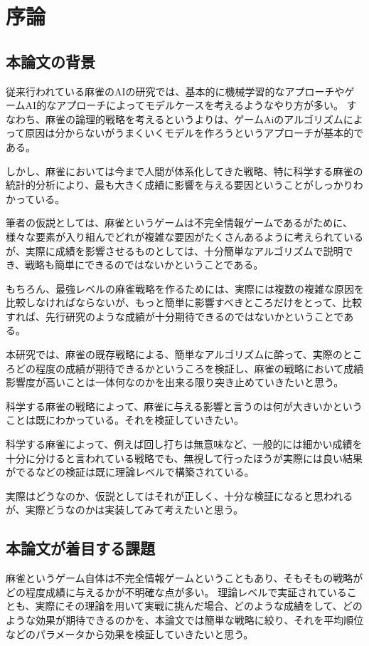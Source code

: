 \chapter{序論}
\label{chap:introduction}

\section{本論文の背景}
従来行われている麻雀のAIの研究では、基本的に機械学習的なアプローチやゲームAI的なアプローチによってモデルケースを考えるようなやり方が多い。
すなわち、麻雀の論理的戦略を考えるというよりは、ゲームAiのアルゴリズムによって原因は分からないがうまくいくモデルを作ろうというアプローチが基本的である。

しかし、麻雀においては今まで人間が体系化してきた戦略、特に科学する麻雀の統計的分析により、最も大きく成績に影響を与える要因ということがしっかりわかっている。

筆者の仮説としては、麻雀というゲームは不完全情報ゲームであるがために、様々な要素が入り組んでどれが複雑な要因がたくさんあるように考えられているが、実際に成績を影響させるものとしては、十分簡単なアルゴリズムで説明でき、戦略も簡単にできるのではないかということである。

もちろん、最強レベルの麻雀戦略を作るためには、実際には複数の複雑な原因を比較しなければならないが、もっと簡単に影響すべきところだけをとって、比較すれば、先行研究のような成績が十分期待できるのではないかということである。

本研究では、麻雀の既存戦略による、簡単なアルゴリズムに酔って、実際のところどの程度の成績が期待できるかというころを検証し、麻雀の戦略において成績影響度が高いことは一体何なのかを出来る限り突き止めていきたいと思う。

科学する麻雀の戦略によって、麻雀に与える影響と言うのは何が大きいかということは既にわかっている。それを検証していきたい。

科学する麻雀によって、例えば回し打ちは無意味など、一般的には細かい成績を十分に分けると言われている戦略でも、無視して行ったほうが実際には良い結果がでるなどの検証は既に理論レベルで構築されている。

実際はどうなのか、仮説としてはそれが正しく、十分な検証になると思われるが、実際どうなのかは実装してみて考えたいと思う。

\section{本論文が着目する課題}
麻雀というゲーム自体は不完全情報ゲームということもあり、そもそもの戦略がどの程度成績に与えるかが不明確な点が多い。
理論レベルで実証されていることも、実際にその理論を用いて実戦に挑んだ場合、どのような成績をして、どのような効果が期待できるのかを、本論文では簡単な戦略に絞り、それを平均順位などのパラメータから効果を検証していきたいと思う。

